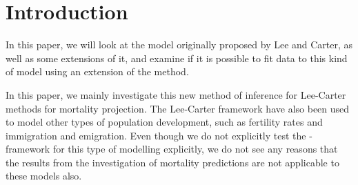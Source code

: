 \section{Introduction}
In this paper, we will look at the model originally proposed by Lee and Carter, as well as some extensions of it, and examine if it is possible to fit data to this kind of model using an extension of the \inla method. 

In this paper, we mainly investigate this new method of inference for Lee-Carter methods for mortality projection. The Lee-Carter framework have also been used to model other types of population development, such as fertility rates and immigration and emigration. Even though we do not explicitly test the \inlabru-framework for this type of modelling explicitly, we do not see any reasons that the results from the investigation of mortality predictions are not applicable to these models also. 